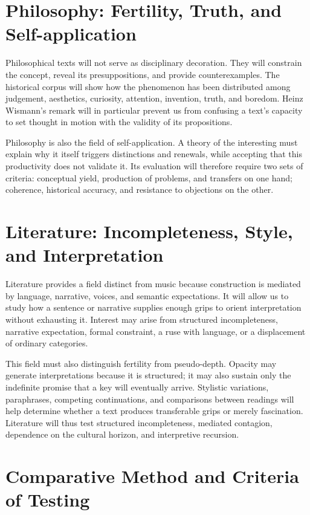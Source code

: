 \documentclass[11pt,a4paper]{article}
\begin{document}
\section{Philosophy: Fertility, Truth, and Self-application}

Philosophical texts will not serve as disciplinary decoration. They will
constrain the concept, reveal its presuppositions, and provide counterexamples.
The historical corpus will show how the phenomenon has been distributed among
judgement, aesthetics, curiosity, attention, invention, truth, and boredom.
Heinz Wismann's remark will in particular prevent us from confusing a text's
capacity to set thought in motion with the validity of its propositions.

Philosophy is also the field of self-application. A theory of the interesting
must explain why it itself triggers distinctions and renewals, while accepting
that this productivity does not validate it. Its evaluation will therefore
require two sets of criteria: conceptual yield, production of problems, and
transfers on one hand; coherence, historical accuracy, and resistance to
objections on the other.

\section{Literature: Incompleteness, Style, and Interpretation}

Literature provides a field distinct from music because construction is
mediated by language, narrative, voices, and semantic expectations. It will
allow us to study how a sentence or narrative supplies enough grips to orient
interpretation without exhausting it. Interest may arise from structured
incompleteness, narrative expectation, formal constraint, a ruse with language,
or a displacement of ordinary categories.

This field must also distinguish fertility from pseudo-depth. Opacity may
generate interpretations because it is structured; it may also sustain only the
indefinite promise that a key will eventually arrive. Stylistic variations,
paraphrases, competing continuations, and comparisons between readings will
help determine whether a text produces transferable grips or merely
fascination. Literature will thus test structured incompleteness, mediated
contagion, dependence on the cultural horizon, and interpretive recursion.

\section{Comparative Method and Criteria of Testing}
\end{document}
